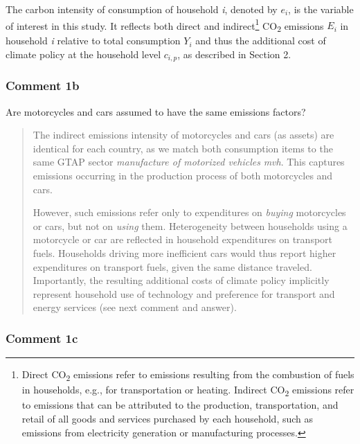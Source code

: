 \documentclass[11pt]{article}
\newenvironment{response}
{\begin{quote}\color{black}}
{\end{quote}}
\begin{document}
\begin{revisionbox}
    The carbon intensity of consumption of household \textit{i}, denoted by $e_{i}$, is the variable of interest in this study. It reflects both direct and indirect\footnote{Direct CO\textsubscript{2} emissions refer to emissions resulting from the combustion of fuels in households, e.g., for transportation or heating. Indirect CO\textsubscript{2} emissions refer to emissions that can be attributed to the production, transportation, and retail of all goods and services purchased by each household, such as emissions from electricity generation or manufacturing processes.} CO\textsubscript{2} emissions $E_{i}$ in household \textit{i} relative to total consumption $Y_{i}$ and thus the additional cost of climate policy at the household level $c_{i,p}$, as described in Section 2.
\end{revisionbox}

\subsubsection*{Comment 1b}\label{comment_R2_1b}

\begin{commentbox}
    Are motorcycles and cars assumed to have the same emissions factors?
\end{commentbox}

\begin{response}
    The indirect emissions intensity of motorcycles and cars (as assets) are identical for each country, as we match both consumption items to the same GTAP sector \textit{manufacture of motorized vehicles} \textit{mvh}. This captures emissions occurring in the production process of both motorcycles and cars.

    However, such emissions refer only to expenditures on \textit{buying} motorcycles or cars, but not on \textit{using} them. Heterogeneity between households using a motorcycle or car are reflected in household expenditures on transport fuels. Households driving more inefficient cars would thus report higher expenditures on transport fuels, given the same distance traveled. Importantly, the resulting additional costs of climate policy implicitly represent household use of technology and preference for transport and energy services (see next comment and answer).
\end{response}

\subsubsection*{Comment 1c}\label{comment_R2_1c}
\end{document}
